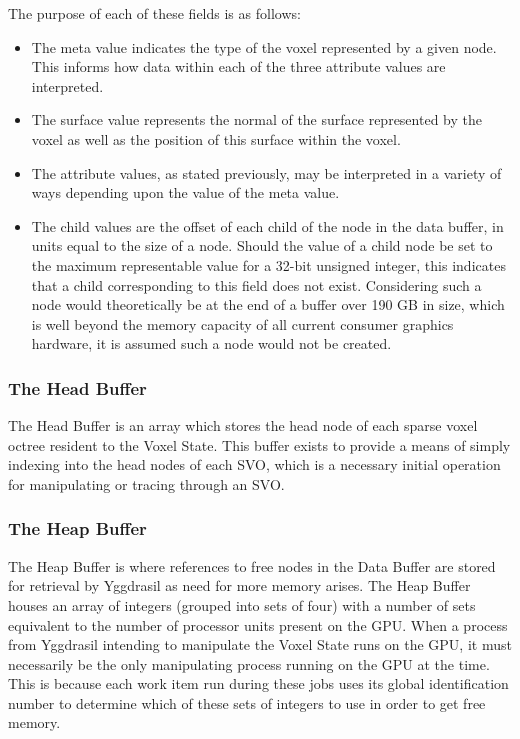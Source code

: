 \documentclass[onecolumn, draftclsnofoot,10pt, compsoc]{IEEEtran}
\begin{document}
The purpose of each of these fields is as follows:

\begin{itemize}

\item The meta value indicates the type of the voxel represented by a given node. This informs how data within each of the three attribute values are interpreted.
\item The surface value represents the normal of the surface represented by the voxel as well as the position of this surface within the voxel.
\item The attribute values, as stated previously, may be interpreted in a variety of ways depending upon the value of the meta value.
\item The child values are the offset of each child of the node in the data buffer, in units equal to the size of a node. Should the value of a child node be set to the maximum representable value for a 32-bit unsigned integer, this indicates that a child corresponding to this field does not exist. Considering such a node would theoretically be at the end of a buffer over 190 GB in size, which is well beyond the memory capacity of all current consumer graphics hardware, it is assumed such a node would not be created.
\end{itemize}


\subsubsection{The Head Buffer}

The Head Buffer is an array which stores the head node of each sparse voxel octree resident to the Voxel State. This buffer exists to provide a means of simply indexing into the head nodes of each SVO, which is a necessary initial operation for manipulating or tracing through an SVO.\\


\subsubsection{The Heap Buffer}

The Heap Buffer is where references to free nodes in the Data Buffer are stored for retrieval by Yggdrasil as need for more memory arises. The Heap Buffer houses an array of integers (grouped into sets of  four) with a number of sets equivalent to the number of processor units present on the GPU. When a process from Yggdrasil intending to manipulate the Voxel State runs on the GPU, it must necessarily be the only manipulating process running on the GPU at the time. This is because each work item run during these jobs uses its global identification number to determine which of these sets of integers to use in order to get free memory.
\end{document}
